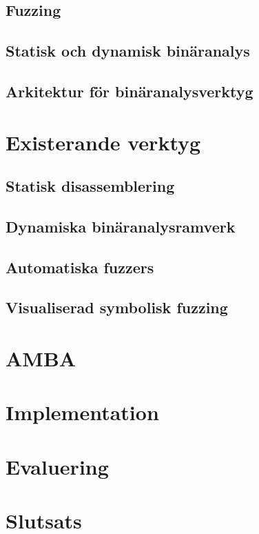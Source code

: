 \documentclass[12pt, a4paper]{report}
\begin{document}
\section{Fuzzing}

\section{Statisk och dynamisk binäranalys}

\section{Arkitektur för binäranalysverktyg}


\chapter{Existerande verktyg}\label{chap:existerande_verktyg}

\section{Statisk disassemblering}

\section{Dynamiska binäranalysramverk}

\section{Automatiska fuzzers}

\section{Visualiserad symbolisk fuzzing}\label{sec:existerande-visualiserad}


\chapter{AMBA}\label{chap:amba}


\chapter{Implementation}\label{chap:implementation}


\chapter{Evaluering}\label{chap:evaluering}


\chapter{Slutsats}\label{chap:slutsats}


\printbibliography{}
\end{document}
